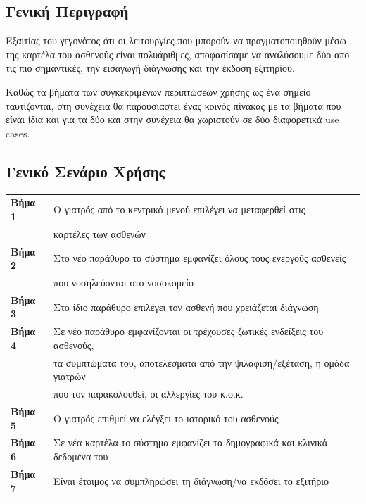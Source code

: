 \documentclass{article}
\newcommand\T{\rule{0pt}{2.6ex}}       %
\newcommand\B{\rule[-1.2ex]{0pt}{0pt}}
\begin{document}
\subsection{Γενική Περιγραφή}

Εξαιτίας του γεγονότος ότι οι λειτουργίες που μπορούν να πραγματοποιηθούν μέσω της καρτέλα του ασθενούς είναι πολυάριθμες, αποφασίσαμε να αναλύσουμε δύο απο τις πιο σημαντικές, την εισαγωγή διάγνωσης και την έκδοση εξιτηρίου.
\par Καθώς τα βήματα των συγκεκριμένων περιπτώσεων χρήσης ως ένα σημείο ταυτίζονται, στη συνέχεια θα παρουσιαστεί ένας κοινός πίνακας με τα βήματα που είναι ίδια και για τα δύο και στην συνέχεια θα χωριστούν σε δύο διαφορετικά use cases. 

 \subsection{Γενικό Σενάριο Χρήσης}
 
 \begin{center}
     \begin{tabular}{|l|l|}
     \hline
      \textbf{Βήμα 1} & Ο γιατρός από το κεντρικό μενού επιλέγει να μεταφερθεί στις \T \\& καρτέλες των ασθενών \B \\
      \hline
      \textbf{Βήμα 2} &  Στο νέο παράθυρο το σύστημα εμφανίζει όλους τους ενεργούς ασθενείς \T \\& που νοσηλεύονται στο νοσοκομείο \B \\
      \hline
      \textbf{Βήμα 3} & Στο ίδιο παράθυρο επιλέγει τον ασθενή που χρειάζεται διάγνωση \T\B \\
      \hline
      \textbf{Βήμα 4} & Σε νέο παράθυρο εμφανίζονται οι τρέχουσες ζωτικές ενδείξεις του ασθενούς, \T \\& τα συμπτώματα του, αποτελέσματα από την ψιλάφιση/εξέταση, η ομάδα γιατρών \\& που τον παρακολουθεί, οι αλλεργίες του κ.ο.κ. \B \\
      \hline
      \textbf{Βήμα 5} & Ο γιατρός επιθμεί να ελέγξει το ιστορικό του ασθενούς \T\B \\
      \hline
      \textbf{Βήμα 6} & Σε νέα καρτέλα το σύστημα εμφανίζει τα δημογραφικά και κλινικά δεδομένα του \T\B \\
      \hline
      \textbf{Βήμα 7} & Είναι έτοιμος να συμπληρώσει τη διάγνωση/να εκδόσει το εξιτήριο \T\B \\
      \hline      
     
     \end{tabular}
 \end{center}
 
\end{document}
